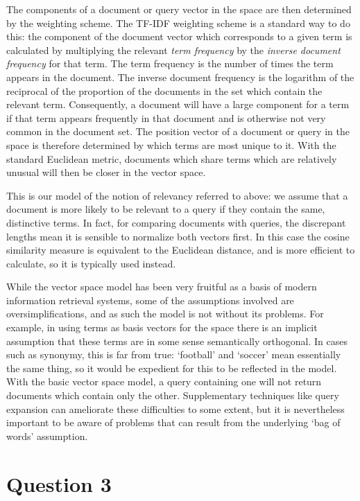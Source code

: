 \documentclass[11pt]{article}
\begin{document}
The components of a document or query vector in the space are then determined
by the weighting scheme. The TF-IDF weighting scheme is a standard way to do
this: the component of the document vector which corresponds to a given term is
calculated by multiplying the relevant \emph{term frequency} by the
\emph{inverse document frequency} for that term. The term frequency is the
number of times the term appears in the document. The inverse document
frequency is the logarithm of the reciprocal of the proportion of the documents
in the set which contain the relevant term. Consequently, a document
will have a large component for a term if that term appears frequently in that
document and is otherwise not very common in the document set. The position
vector of a document or query in the space is therefore determined by which
terms are most unique to it. With the standard Euclidean metric, documents
which share terms which are relatively unusual will then be closer in the
vector space.

This is our model of the notion of relevancy referred to above: we assume that
a document is more likely to be relevant to a query if they contain the same,
distinctive terms.  In fact, for comparing documents with queries, the
discrepant lengths mean it is sensible to normalize both vectors first. In this
case the cosine similarity measure is equivalent to the Euclidean distance, and
is more efficient to calculate, so it is typically used instead.

While the vector space model has been very fruitful as a basis of modern
information retrieval systems, some of the assumptions involved are
oversimplifications, and as such the model is not without its problems. For
example, in using terms as basis vectors for the space there is an implicit
assumption that these terms are in some sense semantically orthogonal. In cases
such as synonymy, this is far from true: `football' and `soccer' mean
essentially the same thing, so it would be expedient for this to be reflected
in the model. With the basic vector space model, a query containing one will
not return documents which contain only the other. Supplementary techniques
like query expansion can ameliorate these difficulties to some extent, but it
is nevertheless important to be aware of problems that can result from the
underlying `bag of words' assumption.

\section*{Question 3}
\end{document}
